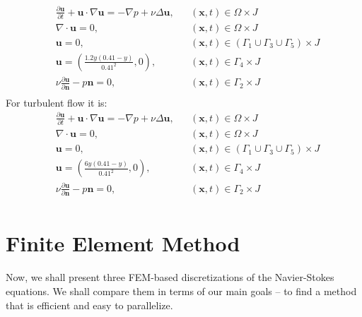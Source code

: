 \begin{equation}
\begin{aligned}
  &\frac{\partial\mathbf{u}}{\partial t} + \mathbf{u} \cdot \nabla\mathbf{u} = -\nabla p + \nu\Delta\mathbf{u}, &&\left(\mathbf{x}, t\right) \in \Omega \times J \\
  &\nabla \cdot \mathbf{u} = 0, &&\left(\mathbf{x}, t\right) \in \Omega \times J \\
  &\mathbf{u} = 0, &&\left(\mathbf{x}, t\right) \in \left(\Gamma_1 \cup \Gamma_3 \cup \Gamma_5\right) \times J \\
  &\mathbf{u} = \left(\frac{1.2y\left(0.41 - y\right)}{0.41^2}, 0\right), &&\left(\mathbf{x}, t\right) \in \Gamma_4 \times J \\
  &\nu\frac{\partial\mathbf{u}}{\partial\mathbf{n}} -p\mathbf{n} = 0, &&\left(\mathbf{x}, t\right) \in \Gamma_2 \times J \\
\end{aligned}\label{eq:laminar_differential_form}
\end{equation}
For turbulent flow it is:
\begin{equation}
\begin{aligned}
  &\frac{\partial\mathbf{u}}{\partial t} + \mathbf{u} \cdot \nabla\mathbf{u} = -\nabla p + \nu\Delta\mathbf{u}, &&\left(\mathbf{x}, t\right) \in \Omega \times J \\
  &\nabla \cdot \mathbf{u} = 0, &&\left(\mathbf{x}, t\right) \in \Omega \times J \\
  &\mathbf{u} = 0, &&\left(\mathbf{x}, t\right) \in \left(\Gamma_1 \cup \Gamma_3 \cup \Gamma_5\right) \times J \\
  &\mathbf{u} = \left(\frac{6y(0.41-y)}{0.41^2}, 0\right), &&\left(\mathbf{x}, t\right) \in \Gamma_4 \times J \\
  &\nu\frac{\partial\mathbf{u}}{\partial\mathbf{n}} -p\mathbf{n} = 0, &&\left(\mathbf{x}, t\right) \in \Gamma_2 \times J \\
\end{aligned}\label{eq:turbulent_differential_form}
\end{equation}

\section{Finite Element Method}
Now, we shall present three FEM-based discretizations of the Navier-Stokes equations. We shall compare them in terms of our main goals -- to find a method that is efficient and easy to parallelize.
